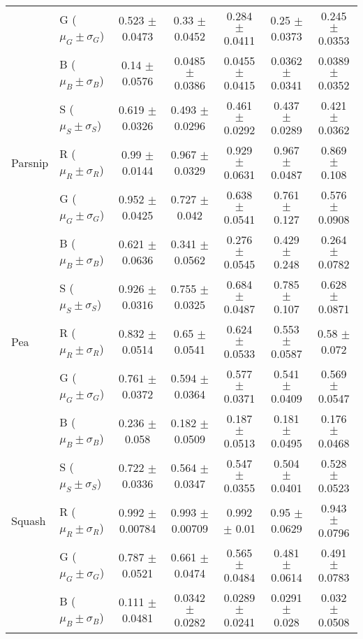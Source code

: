 \documentclass[authoryear]{elsarticle}
\begin{document}
\begin{tabular}{llccccc}
         		 & G ($\mu_G \pm \sigma_G$) & 0.523 $\pm$ 0.0473 & 0.33 $\pm$ 0.0452 & 0.284 $\pm$ 0.0411 & 0.25 $\pm$ 0.0373 & 0.245 $\pm$ 0.0353 \\
          		 & B ($\mu_B \pm \sigma_B$) & 0.14 $\pm$ 0.0576 & 0.0485 $\pm$ 0.0386 & 0.0455 $\pm$ 0.0415 & 0.0362 $\pm$ 0.0341 & 0.0389 $\pm$ 0.0352 \\
          		 & S ($\mu_S \pm \sigma_S$) & 0.619 $\pm$ 0.0326 & 0.493 $\pm$ 0.0296 & 0.461 $\pm$ 0.0292 & 0.437 $\pm$ 0.0289 & 0.421 $\pm$ 0.0362 \\
    \midrule
    Parsnip		 & R ($\mu_R \pm \sigma_R$) & 0.99 $\pm$ 0.0144 & 0.967 $\pm$ 0.0329 & 0.929 $\pm$ 0.0631 & 0.967 $\pm$ 0.0487 & 0.869 $\pm$ 0.108 \\
         		 & G ($\mu_G \pm \sigma_G$) & 0.952 $\pm$ 0.0425 & 0.727 $\pm$ 0.042 & 0.638 $\pm$ 0.0541 & 0.761 $\pm$ 0.127 & 0.576 $\pm$ 0.0908 \\
          		 & B ($\mu_B \pm \sigma_B$) & 0.621 $\pm$ 0.0636 & 0.341 $\pm$ 0.0562 & 0.276 $\pm$ 0.0545 & 0.429 $\pm$ 0.248 & 0.264 $\pm$ 0.0782 \\
          		 & S ($\mu_S \pm \sigma_S$) & 0.926 $\pm$ 0.0316 & 0.755 $\pm$ 0.0325 & 0.684 $\pm$ 0.0487 & 0.785 $\pm$ 0.107 & 0.628 $\pm$ 0.0871 \\
    \midrule
    Pea			 & R ($\mu_R \pm \sigma_R$) & 0.832 $\pm$ 0.0514 & 0.65 $\pm$ 0.0541 & 0.624 $\pm$ 0.0533 & 0.553 $\pm$ 0.0587 & 0.58 $\pm$ 0.072 \\
         		 & G ($\mu_G \pm \sigma_G$) & 0.761 $\pm$ 0.0372 & 0.594 $\pm$ 0.0364 & 0.577 $\pm$ 0.0371 & 0.541 $\pm$ 0.0409 & 0.569 $\pm$ 0.0547 \\
          		 & B ($\mu_B \pm \sigma_B$) & 0.236 $\pm$ 0.058 & 0.182 $\pm$ 0.0509 & 0.187 $\pm$ 0.0513 & 0.181 $\pm$ 0.0495 & 0.176 $\pm$ 0.0468 \\
          		 & S ($\mu_S \pm \sigma_S$) & 0.722 $\pm$ 0.0336 & 0.564 $\pm$ 0.0347 & 0.547 $\pm$ 0.0355 & 0.504 $\pm$ 0.0401 & 0.528 $\pm$ 0.0523 \\
    \midrule
    Squash		 & R ($\mu_R \pm \sigma_R$) & 0.992 $\pm$ 0.00784 & 0.993 $\pm$ 0.00709 & 0.992 $\pm$ 0.01 & 0.95 $\pm$ 0.0629 & 0.943 $\pm$ 0.0796 \\
         		 & G ($\mu_G \pm \sigma_G$) & 0.787 $\pm$ 0.0521 & 0.661 $\pm$ 0.0474 & 0.565 $\pm$ 0.0484 & 0.481 $\pm$ 0.0614 & 0.491 $\pm$ 0.0783 \\
          		 & B ($\mu_B \pm \sigma_B$) & 0.111 $\pm$ 0.0481 & 0.0342 $\pm$ 0.0282 & 0.0289 $\pm$ 0.0241 & 0.0291 $\pm$ 0.028 & 0.032 $\pm$ 0.0508 \\

\end{tabular}
\end{document}
